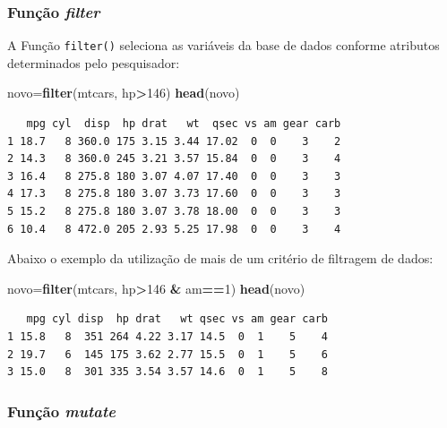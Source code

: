 \documentclass[12pt,brazil,oneside]{book}
\newenvironment{Shaded}{\begin{snugshade}}{\end{snugshade}}
\newcommand{\DecValTok}[1]{\textcolor[rgb]{0.00,0.00,0.81}{#1}}
\newcommand{\KeywordTok}[1]{\textcolor[rgb]{0.13,0.29,0.53}{\textbf{#1}}}
\newcommand{\NormalTok}[1]{#1}
\newcommand{\OperatorTok}[1]{\textcolor[rgb]{0.81,0.36,0.00}{\textbf{#1}}}
\newcommand{\StringTok}[1]{\textcolor[rgb]{0.31,0.60,0.02}{#1}}
\begin{document}
\hypertarget{funcao-filter}{%
\subsubsection{\texorpdfstring{Função \emph{filter}}{Função filter}}\label{funcao-filter}}

A Função \texttt{filter()} seleciona as variáveis da base de dados conforme atributos determinados pelo pesquisador:

\begin{Shaded}
\begin{Highlighting}[]
\NormalTok{novo=}\KeywordTok{filter}\NormalTok{(mtcars, hp}\OperatorTok{>}\DecValTok{146}\NormalTok{)}
\KeywordTok{head}\NormalTok{(novo)}
\end{Highlighting}
\end{Shaded}

\begin{verbatim}
   mpg cyl  disp  hp drat   wt  qsec vs am gear carb
1 18.7   8 360.0 175 3.15 3.44 17.02  0  0    3    2
2 14.3   8 360.0 245 3.21 3.57 15.84  0  0    3    4
3 16.4   8 275.8 180 3.07 4.07 17.40  0  0    3    3
4 17.3   8 275.8 180 3.07 3.73 17.60  0  0    3    3
5 15.2   8 275.8 180 3.07 3.78 18.00  0  0    3    3
6 10.4   8 472.0 205 2.93 5.25 17.98  0  0    3    4
\end{verbatim}

Abaixo o exemplo da utilização de mais de um critério de filtragem de dados:

\begin{Shaded}
\begin{Highlighting}[]
\NormalTok{novo=}\KeywordTok{filter}\NormalTok{(mtcars, hp}\OperatorTok{>}\DecValTok{146} \OperatorTok{&}\StringTok{ }\NormalTok{am}\OperatorTok{==}\DecValTok{1}\NormalTok{)}
\KeywordTok{head}\NormalTok{(novo)}
\end{Highlighting}
\end{Shaded}

\begin{verbatim}
   mpg cyl disp  hp drat   wt qsec vs am gear carb
1 15.8   8  351 264 4.22 3.17 14.5  0  1    5    4
2 19.7   6  145 175 3.62 2.77 15.5  0  1    5    6
3 15.0   8  301 335 3.54 3.57 14.6  0  1    5    8
\end{verbatim}

\hypertarget{funcao-mutate}{%
\subsubsection{\texorpdfstring{Função \emph{mutate}}{Função mutate}}\label{funcao-mutate}}
\end{document}
